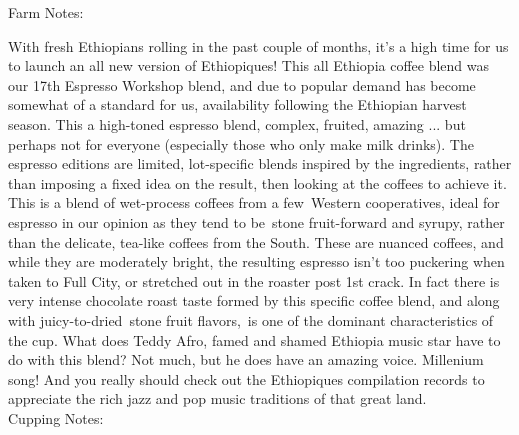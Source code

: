 \documentclass[10pt,twoside,footinclude=true,headinclude=true]{scrbook} %
\newlength{\mysize}
\newcommand{\myfontsize}[1]{
  \setlength{\mysize}{#1pt}
  \fontsize{\mysize}{1.2\mysize}
  \selectfont
}
\begin{document}

\newpage
\vspace*{-2.2em}
\linespread{1.2}
\raggedright
\normalsize
Farm Notes: \\
\myfontsize{8}
With fresh Ethiopians rolling in the past couple of months, it's a high time for us to launch an all new version of Ethiopiques! This all Ethiopia coffee blend was our 17th Espresso Workshop blend, and due to popular demand has become somewhat of a standard for us, availability following the Ethiopian harvest season. This a high-toned espresso blend, complex, fruited, amazing ... but perhaps not for everyone (especially those who only make milk drinks). The espresso editions are limited, lot-specific blends inspired by the ingredients, rather than imposing a fixed idea on the result, then looking at the coffees to achieve it. This is a blend of wet-process coffees from a few Western cooperatives, ideal for espresso in our opinion as they tend to be stone fruit-forward and syrupy, rather than the delicate, tea-like coffees from the South. These are nuanced coffees, and while they are moderately bright, the resulting espresso isn't too puckering when taken to Full City, or stretched out in the roaster post 1st crack. In fact there is very intense chocolate roast taste formed by this specific coffee blend, and along with juicy-to-dried stone fruit flavors, is one of the dominant characteristics of the cup. What does Teddy Afro, famed and shamed Ethiopia music star have to do with this blend? Not much, but he does have an amazing voice. Millenium song! And you really should check out the Ethiopiques compilation records to appreciate the rich jazz and pop music traditions of that great land. \\
\medskip
\normalsize
Cupping Notes: \\
\myfontsize{8}
\end{document}
